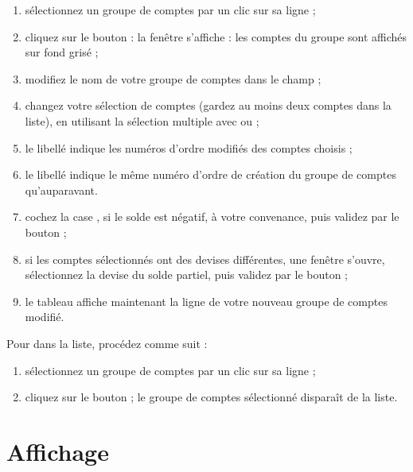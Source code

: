 \begin{enumerate}
	\item sélectionnez un groupe de comptes par un clic sur sa ligne ;
	\item cliquez sur le bouton  : la fenêtre  s'affiche : les comptes du groupe sont affichés sur fond grisé ;
	\item modifiez le nom de votre groupe de comptes dans le champ  ;
	\item changez votre sélection de comptes (gardez au moins deux comptes dans la liste), en utilisant la sélection multiple avec  ou  ; 
 	\item le libellé  indique les numéros d'ordre modifiés des comptes choisis ;
	\item le libellé  indique le même numéro d'ordre de création du groupe de comptes qu'auparavant.

	\item cochez la case  , si le solde est négatif, à votre convenance, puis validez par le bouton  ;
	\item si les comptes sélectionnés ont des devises différentes, une fenêtre s'ouvre, sélectionnez la devise du solde partiel, puis validez par le bouton  ;
	\item le tableau  affiche maintenant la ligne de votre nouveau groupe de comptes modifié. 
\end{enumerate}


Pour  dans la liste, procédez comme suit :

\begin{enumerate}
	\item sélectionnez un groupe de comptes par un clic sur sa ligne ;
	\item cliquez sur le bouton  ; le groupe de comptes sélectionné disparaît de la liste.
\end{enumerate}

\newpage


\section{Affichage\label{setup-display}}


